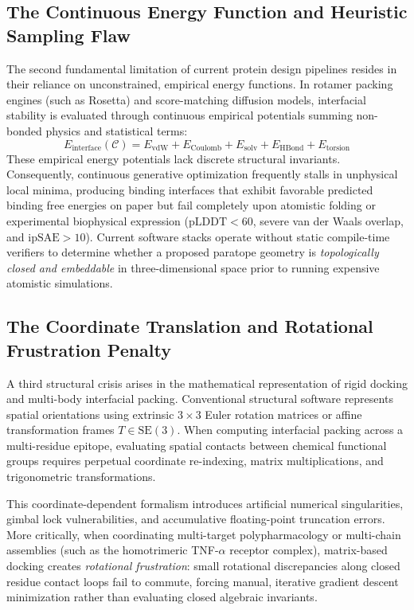 \subsection{The Continuous Energy Function and Heuristic Sampling Flaw}
The second fundamental limitation of current protein design pipelines resides in their reliance on unconstrained, empirical energy functions. In rotamer packing engines (such as Rosetta) and score-matching diffusion models, interfacial stability is evaluated through continuous empirical potentials summing non-bonded physics and statistical terms:
\begin{equation}
    E_{\text{interface}}(\mathcal{C}) = E_{\text{vdW}} + E_{\text{Coulomb}} + E_{\text{solv}} + E_{\text{HBond}} + E_{\text{torsion}}
\end{equation}
These empirical energy potentials lack discrete structural invariants. Consequently, continuous generative optimization frequently stalls in unphysical local minima, producing binding interfaces that exhibit favorable predicted binding free energies on paper but fail completely upon atomistic folding or experimental biophysical expression ($\text{pLDDT} < 60$, severe van der Waals overlap, and $\text{ipSAE} > 10$). Current software stacks operate without static compile-time verifiers to determine whether a proposed paratope geometry is \textit{topologically closed and embeddable} in three-dimensional space prior to running expensive atomistic simulations.

\subsection{The Coordinate Translation and Rotational Frustration Penalty}
A third structural crisis arises in the mathematical representation of rigid docking and multi-body interfacial packing. Conventional structural software represents spatial orientations using extrinsic $3 \times 3$ Euler rotation matrices or affine transformation frames $T \in \mathrm{SE}(3)$. When computing interfacial packing across a multi-residue epitope, evaluating spatial contacts between chemical functional groups requires perpetual coordinate re-indexing, matrix multiplications, and trigonometric transformations.

This coordinate-dependent formalism introduces artificial numerical singularities, gimbal lock vulnerabilities, and accumulative floating-point truncation errors. More critically, when coordinating multi-target polypharmacology or multi-chain assemblies (such as the homotrimeric TNF-$\alpha$ receptor complex), matrix-based docking creates \textit{rotational frustration}: small rotational discrepancies along closed residue contact loops fail to commute, forcing manual, iterative gradient descent minimization rather than evaluating closed algebraic invariants.

